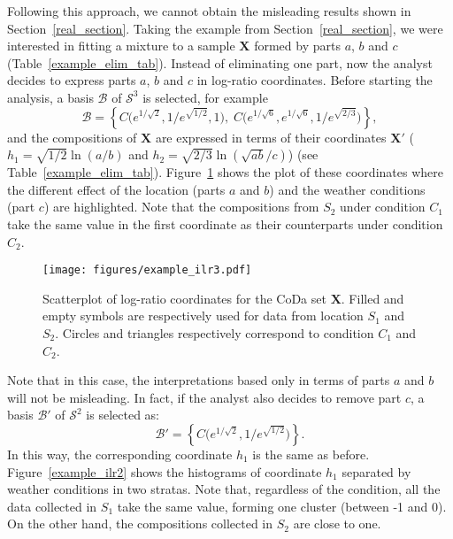 \documentclass[12pt, a4paper]{article}
\begin{document}
Following this approach, we cannot obtain the misleading results shown in Section~\ref{real_section}. Taking the example from Section~\ref{real_section}, we were interested in fitting a mixture to a sample $\mathbf{X}$ formed by parts $a$, $b$ and $c$ (Table~\ref{example_elim_tab}). Instead of eliminating one part, now the analyst decides to express parts $a$, $b$ and $c$ in log-ratio coordinates. Before starting the analysis, a basis $\mathcal{B}$ of $\mathcal{S}^3$ is selected, for example
\begin{equation}\label{basis3}
\mathcal{B} = \left\{ C\Big( e^{1/\sqrt{2}}, 1/e^{\sqrt{1/2}}, 1 \Big), \; C\Big( e^{1/\sqrt{6}}, e^{1/\sqrt{6}}, 1/e^{\sqrt{2/3}} \Big) \right\},
\end{equation}
and the compositions of $\mathbf{X}$ are expressed in terms of their coordinates  $\mathbf{X}'$ ($h_1 = \sqrt{1/2} \ln(a/b)$ and $h_2 = \sqrt{2/3} \ln(\sqrt{ab} / c)$) (see Table~\ref{example_elim_tab}). Figure~\ref{example_ilr3} shows the plot of these coordinates where the different effect of the location (parts $a$ and $b$) and the weather conditions (part $c$) are highlighted. Note that the compositions from $S_2$ under condition $C_1$ take the same value in the first coordinate as their counterparts under condition $C_2$. 

\begin{figure}[thbp]
\centering
\texttt{[image: figures/example\_ilr3.pdf]}
\caption{Scatterplot of log-ratio coordinates for the CoDa set $\mathbf{X}$. Filled and empty symbols are respectively used for data from location $S_1$ and $S_2$. Circles and triangles respectively correspond to condition $C_1$ and $C_2$.}\label{example_ilr3}
\end{figure}

Note that in this case, the interpretations based only in terms of parts $a$ and $b$ will not be misleading. In fact, if the analyst also decides to remove part $c$, a basis $\mathcal{B}'$ of $\mathcal{S}^2$ is selected as:
\[
\mathcal{B}' = \left\{ C\Big( e^{1/\sqrt{2}}, 1/e^{\sqrt{1/2}} \Big) \right\}.
\]
In this way, the corresponding coordinate $h_1$ is the same as before. Figure~\ref{example_ilr2} 
shows the histograms of coordinate $h_1$ separated by weather conditions in two stratas. Note that, regardless of the condition, all the data collected in $S_1$ take the same value, forming one cluster (between -1 and 0). On the other hand, the compositions collected in $S_2$ are close to one.
\end{document}
